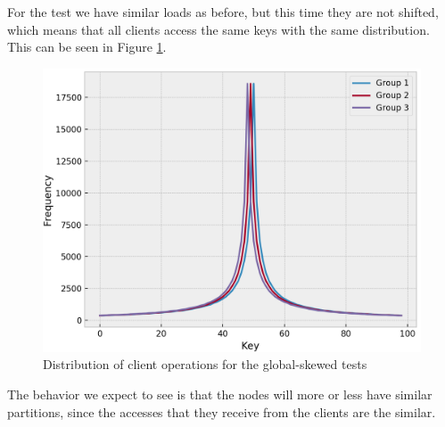For the test we have similar loads as before, but this time they are not shifted, which means that all clients access the same keys with the same distribution. This can be seen in Figure \ref{fig:global-skewed-loads}.

\begin{figure}[!htb]
  \centering
  \includegraphics[width=\textwidth,height=\textheight,keepaspectratio]{img/clients_loads_global.png}
  \caption{ Distribution of client operations for the global-skewed tests }
  \label{fig:global-skewed-loads}
\end{figure}

The behavior we expect to see is that the nodes will more or less have similar partitions, since the accesses that they receive from the clients are the similar.


